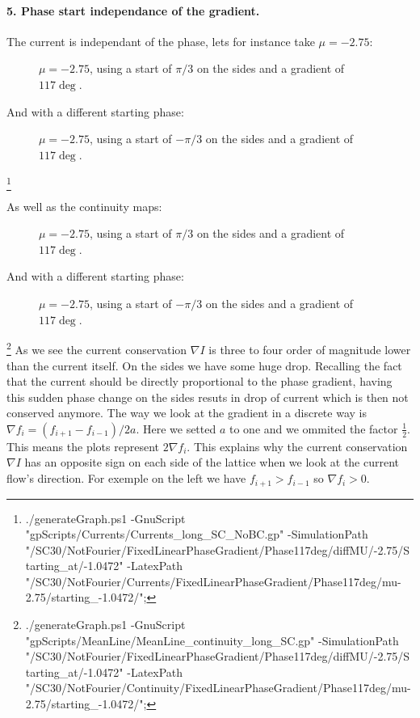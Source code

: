\documentclass[../main.tex]{subfiles}
\begin{document}
\paragraph{5. Phase start independance of the gradient.}$~$\\
The current is independant of the phase, lets for instance take $\mu = -2.75$:
\begin{figure}[H]
    \centering
    
    \caption{$\mu = -2.75$, using a start of $\pi/3$ on the sides and a gradient of $117\si{\deg}$.}
\end{figure}
And  with a different starting phase:
\begin{figure}[H]
    \centering
    
    \caption{$\mu = -2.75$, using a start of $-\pi/3$ on the sides and a gradient of $117\si{\deg}$.}
\end{figure}
\footnote{./generateGraph.ps1 -GnuScript "gpScripts/Currents/Currents\_long\_SC\_NoBC.gp" -SimulationPath "/SC30/NotFourier/FixedLinearPhaseGradient/Phase117deg/diffMU/-2.75/Starting\_at/-1.0472" -LatexPath "/SC30/NotFourier/Currents/FixedLinearPhaseGradient/Phase117deg/mu-2.75/starting\_-1.0472/";}

As well as the continuity maps:
\begin{figure}[H]
    \centering
    
    \caption{$\mu = -2.75$, using a start of $\pi/3$ on the sides and a gradient of $117\si{\deg}$.}
\end{figure}
And  with a different starting phase:
\begin{figure}[H]
    \centering
    
    \caption{$\mu = -2.75$, using a start of $-\pi/3$ on the sides and a gradient of $117\si{\deg}$.}
\end{figure}
\footnote{./generateGraph.ps1 -GnuScript "gpScripts/MeanLine/MeanLine\_continuity\_long\_SC.gp" -SimulationPath "/SC30/NotFourier/FixedLinearPhaseGradient/Phase117deg/diffMU/-2.75/Starting\_at/-1.0472" -LatexPath "/SC30/NotFourier/Continuity/FixedLinearPhaseGradient/Phase117deg/mu-2.75/starting\_-1.0472/";}
As we see the current conservation $\nabla I$ is three to four order of magnitude lower than the current itself. On the sides we have some huge drop. 
Recalling the fact that the current should be directly proportional to the phase gradient, having this sudden phase change 
on the sides resuts in drop of current which is then not conserved anymore. The way we look at the gradient in a discrete
way is $\nabla f_i = (f_{i+1} - f_{i-1})/2a$. Here we setted $a$ to one and we ommited the factor $\frac{1}{2}$. This
means the plots represent $2\nabla f_i$. This explains why the current conservation $\nabla I$ has an opposite sign on each side of the lattice
when we look at the current flow's direction. For exemple on the left we have $f_{i+1} > f_{i-1}$ so $\nabla f_i > 0$. 
\end{document}

